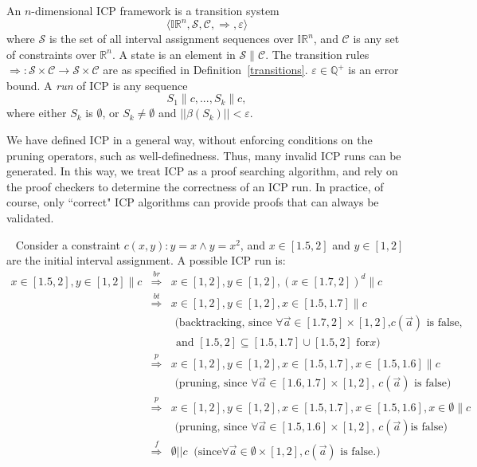 \documentclass[12pt]{article}
\begin{document}
\begin{definition}
An $n$-dimensional ICP framework is a transition system
$$\langle \mathbb{IR}^n, \mathcal{S}, \mathcal{C}, \Longrightarrow,
\varepsilon\rangle$$
where $\mathcal{S}$ is the set of all interval assignment sequences over
$\mathbb{IR}^n$, and $\mathcal{C}$ is any set of constraints over
$\mathbb{R}^n$. A state is an element in $\mathcal{S}\parallel \mathcal{C}$. The
transition rules $\Longrightarrow: \mathcal{S}\times \mathcal{C}\rightarrow
\mathcal{S} \times \mathcal{C}$ are as specified in
Definition~\ref{transitions}. $\varepsilon\in \mathbb{Q}^+$ is an
error bound. A {\em run} of ICP is any sequence
$$S_1\parallel c, ... , S_k\parallel c,$$
where either $S_k$ is $\emptyset$, or $S_k\neq \emptyset$ and
$||\beta(S_k)||<\varepsilon$.
\end{definition}
\begin{remark}
We have defined ICP in a general way, without enforcing conditions
on the pruning operators, such as well-definedness. Thus, many
invalid ICP runs can be generated. In this way, we treat ICP as a proof
searching algorithm, and rely on the proof checkers to determine the correctness
of an ICP run. In practice, of course, only ``correct" ICP algorithms can
provide proofs that can always be validated.
\end{remark}
\begin{example}~\label{icp-example}
Consider a constraint $c(x,y) : y=x \wedge y = x^2$, and $x\in [1.5,2]$ and
$y\in [1,2]$ are the initial interval assignment. A possible ICP run is:
\begin{eqnarray*}
x\in [1.5,2], y\in [1,2]\parallel c &\stackrel{br}{\Longrightarrow}& x\in [1,2],
y\in [1,2], (x\in [1.7, 2])^d\parallel c\\
&\stackrel{bt}{\Longrightarrow}& x\in [1,2], y\in [1,2], x\in [1.5, 1.7]\parallel c\\
& & \mbox{  (backtracking, since $\forall\vec a\in [1.7,2]\times [1,2]$,
$c(\vec a)$ is false,}\\
& & \ \ \mbox{and $[1.5,2]\subseteq[1.5,1.7]\cup [1.5, 2]$ for
$x$)}\\
&\stackrel{p}{\Longrightarrow}& x\in [1,2], y\in [1,2], x\in [1.5, 1.7], x\in
[1.5, 1.6]\parallel c\\
& & \mbox{  (pruning, since $\forall \vec a\in[1.6,1.7]\times [1, 2]$, $c(\vec
a)$ is false)}\\
&\stackrel{p}{\Longrightarrow}& x\in [1,2], y\in [1,2], x\in [1.5, 1.7],
x\in [1.5, 1.6], x\in \emptyset\parallel c\\
& & \mbox{  (pruning, since $\forall \vec a\in[1.5,1.6]\times [1, 2]$, $c(\vec
a)$
is false)}\\
&\stackrel{f}{\Longrightarrow}& \emptyset||c\ \mbox{ (since
$\forall \vec a\in \emptyset \times [1, 2], c(\vec a)$ is false.)}
\end{eqnarray*}
\end{example}
\end{document}
